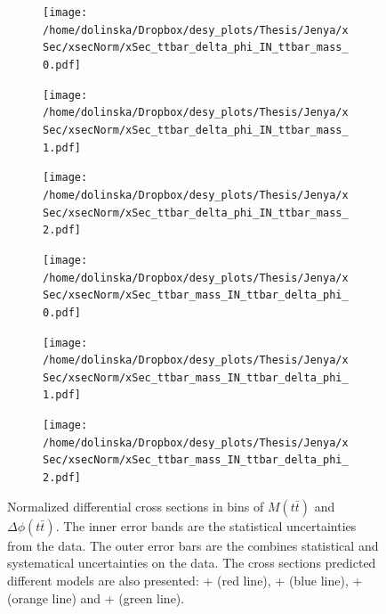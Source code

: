 \begin{figure}
\centering
\begin{subfigure}
  \centering
  \texttt{[image: /home/dolinska/Dropbox/desy\_plots/Thesis/Jenya/xSec/xsecNorm/xSec\_ttbar\_delta\_phi\_IN\_ttbar\_mass\_0.pdf]}
\end{subfigure}
\begin{subfigure}
  \centering
  \texttt{[image: /home/dolinska/Dropbox/desy\_plots/Thesis/Jenya/xSec/xsecNorm/xSec\_ttbar\_delta\_phi\_IN\_ttbar\_mass\_1.pdf]}
\end{subfigure}
\begin{subfigure}
  \centering
  \texttt{[image: /home/dolinska/Dropbox/desy\_plots/Thesis/Jenya/xSec/xsecNorm/xSec\_ttbar\_delta\_phi\_IN\_ttbar\_mass\_2.pdf]}
\end{subfigure}
\begin{subfigure}
  \centering
  \texttt{[image: /home/dolinska/Dropbox/desy\_plots/Thesis/Jenya/xSec/xsecNorm/xSec\_ttbar\_mass\_IN\_ttbar\_delta\_phi\_0.pdf]}
\end{subfigure}
\begin{subfigure}
  \centering
  \texttt{[image: /home/dolinska/Dropbox/desy\_plots/Thesis/Jenya/xSec/xsecNorm/xSec\_ttbar\_mass\_IN\_ttbar\_delta\_phi\_1.pdf]}
\end{subfigure}
\begin{subfigure}
  \centering
  \texttt{[image: /home/dolinska/Dropbox/desy\_plots/Thesis/Jenya/xSec/xsecNorm/xSec\_ttbar\_mass\_IN\_ttbar\_delta\_phi\_2.pdf]}
\end{subfigure}
\caption{Normalized differential cross sections in bins of $M(t\bar{t})$ and $\Delta\phi(t\bar{t})$. The inner error bands are the statistical uncertainties from the data.
         The outer error bars are the combines statistical and systematical uncertainties on the data. The cross sections predicted different models are also presented:
         \MG + \PYTHIA (red line), \Powheg + \PYTHIA (blue line), \Powheg + \HERWIG (orange line) and \MCNLO + \HERWIG (green line).}
\label{fig:XS_2D_phi_Mtt}
\end{figure}


